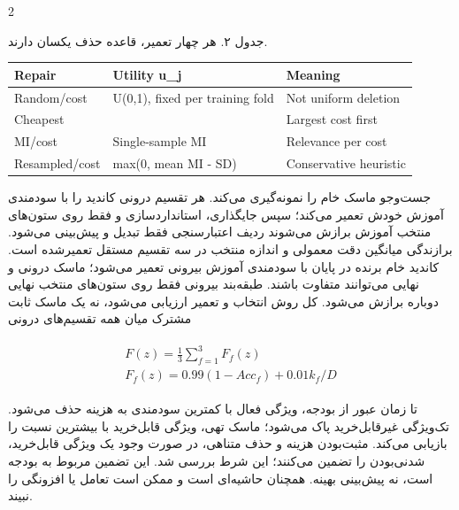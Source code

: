 \documentclass[10pt,a4paper]{article}
\begin{document}
\begin{multicols}{2}
\par\vspace{3pt}\begin{minipage}{\linewidth}{\footnotesize جدول ۲. هر چهار تعمیر، قاعده حذف یکسان دارند.\par}
\begin{latin}
{\fontsize{6.8}{8.3}\selectfont\setlength{\tabcolsep}{2pt}\renewcommand{\arraystretch}{1.1}
\begin{tabularx}{\linewidth}{>{\hsize=1.0000\hsize\raggedright\arraybackslash}X>{\hsize=1.0000\hsize\raggedright\arraybackslash}X>{\hsize=1.0000\hsize\raggedright\arraybackslash}X}\toprule
Repair & Utility u\_j & Meaning\\\midrule
Random/cost & U(0,1), fixed per training fold & Not uniform deletion\\
Cheapest & 1 & Largest cost first\\
MI/cost & Single-sample MI & Relevance per cost\\
Resampled/cost & max(0, mean MI - SD) & Conservative heuristic\\
\bottomrule\end{tabularx}}
\end{latin}
\end{minipage}\par\vspace{3pt}
جست‌وجو ماسک خام را نمونه‌گیری می‌کند. هر تقسیم درونی کاندید را با سودمندی آموزش خودش تعمیر می‌کند؛ سپس جایگذاری، استانداردسازی و  فقط روی ستون‌های منتخب آموزش برازش می‌شوند  ردیف اعتبارسنجی فقط تبدیل و پیش‌بینی می‌شود. برازندگی میانگین دقت معمولی و اندازه منتخب در سه تقسیم مستقل تعمیرشده است. کاندید خام برنده در پایان با سودمندی آموزش بیرونی تعمیر می‌شود؛ ماسک درونی و نهایی می‌توانند متفاوت باشند. طبقه‌بند بیرونی فقط روی ستون‌های منتخب نهایی دوباره برازش می‌شود. کل روش انتخاب و تعمیر ارزیابی می‌شود، نه یک ماسک ثابت مشترک میان همه تقسیم‌های درونی 

\begin{latin}\begin{equation}\begin{gathered}\begin{gathered}F(z)=\frac13\sum_{f=1}^3F_f(z)\\F_f(z)=0.99(1-Acc_f)+0.01k_f/D\end{gathered}\end{gathered}\end{equation}\end{latin}
تا زمان عبور از بودجه، ویژگی فعال با کمترین سودمندی به هزینه حذف می‌شود. تک‌ویژگی غیرقابل‌خرید پاک می‌شود؛ ماسک تهی، ویژگی قابل‌خرید با بیشترین نسبت را بازیابی می‌کند. مثبت‌بودن هزینه و حذف متناهی، در صورت وجود یک ویژگی قابل‌خرید، شدنی‌بودن را تضمین می‌کنند؛ این شرط بررسی شد. این تضمین مربوط به بودجه است، نه پیش‌بینی بهینه.  همچنان حاشیه‌ای است و ممکن است تعامل یا افزونگی را نبیند.


\end{multicols}
\end{document}
